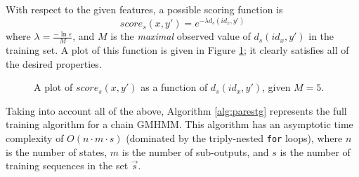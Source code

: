 \documentclass[12pt,a4paper,twoside,openright]{report}
\begin{document}
With respect to the given features, a possible scoring function is
\[score_s(x, y') = e^{-\lambda d_s(id_x, y')}\]
where $\lambda = \frac{-\ln{\varepsilon}}{M}$, and $M$ is the \emph{maximal} observed value of $d_s(id_x, y')$ in the training set. A plot of this function is given in Figure \ref{figplot}; it clearly satisfies all of the desired properties.
\begin{figure}[H]
\centering
{}
	\caption[Plot of $score_s(x, y')$ as a function of $d_s(id_x, y')$]{A plot of $score_s(x, y')$ as a function of $d_s(id_x, y')$, given $M = 5$.}\label{figplot}
\end{figure}
\noindent Taking into account all of the above, Algorithm \ref{alg:parestg} represents the full training algorithm for a chain GMHMM. This algorithm has an asymptotic time complexity of $O(n\cdot m\cdot s)$ (dominated by the triply-nested {\tt for} loops), where $n$ is the number of states, $m$ is the number of sub-outputs, and $s$ is the number of training sequences in the set $\vec{s}$.
\end{document}
